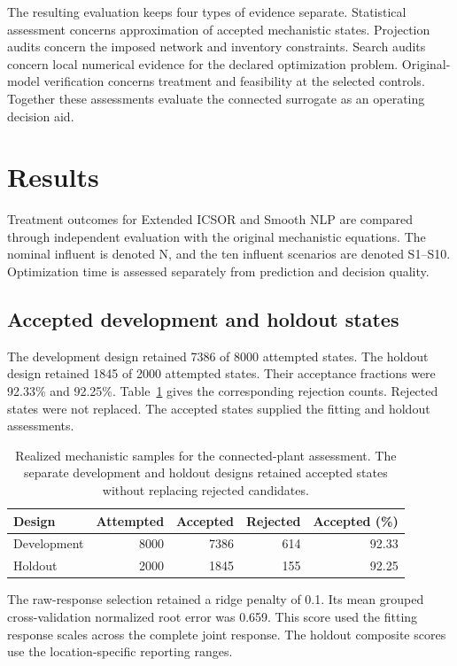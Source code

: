 The resulting evaluation keeps four types of evidence separate. Statistical assessment concerns approximation of accepted mechanistic states. Projection audits concern the imposed network and inventory constraints. Search audits concern local numerical evidence for the declared optimization problem. Original-model verification concerns treatment and feasibility at the selected controls. Together these assessments evaluate the connected surrogate as an operating decision aid.

\section{Results}
\label{sec:plant_results}

Treatment outcomes for Extended ICSOR and Smooth NLP are compared through independent evaluation with the original mechanistic equations. The nominal influent is denoted N, and the ten influent scenarios are denoted S1--S10. Optimization time is assessed separately from prediction and decision quality.

\subsection{Accepted development and holdout states}

The development design retained 7386 of 8000 attempted states. The holdout design retained 1845 of 2000 attempted states. Their acceptance fractions were 92.33\% and 92.25\%. Table~\ref{tab:plant_sample_results} gives the corresponding rejection counts. Rejected states were not replaced. The accepted states supplied the fitting and holdout assessments.

\begin{table}[htbp]
\centering\small
\caption{Realized mechanistic samples for the connected-plant assessment. The separate development and holdout designs retained accepted states without replacing rejected candidates.}
\label{tab:plant_sample_results}
\begin{tabular}{lrrrr}
\toprule
Design & Attempted & Accepted & Rejected & Accepted (\%)\\
\midrule
Development & 8000 & 7386 & 614 & 92.33\\
Holdout & 2000 & 1845 & 155 & 92.25\\
\bottomrule
\end{tabular}
\end{table}

The raw-response selection retained a ridge penalty of 0.1. Its mean grouped cross-validation normalized root error was 0.659. This score used the fitting response scales across the complete joint response. The holdout composite scores use the location-specific reporting ranges.

